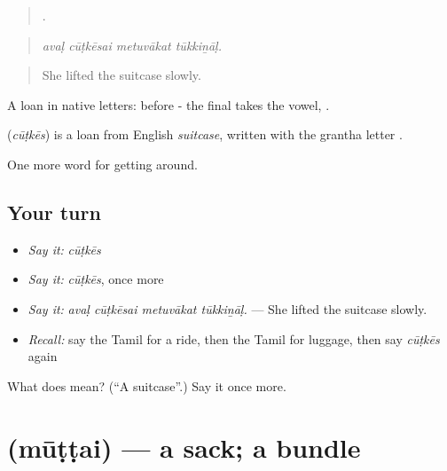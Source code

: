 \begin{quote}
   .
\end{quote}

\begin{quote}
\emph{avaḷ cūṭkēsai metuvākat tūkkiṉāḷ.}
\end{quote}

\begin{quote}
She lifted the suitcase slowly.
\end{quote}

A loan in native letters: before - the final  takes the vowel, .

\begin{cousinweb}
\textbf{} (\emph{cūṭkēs}) is a loan from English \emph{suitcase}, written with the grantha letter .
\end{cousinweb}

\begin{grammarlens}[title={What you've built}]
One more word for getting around.
\end{grammarlens}

\subsection*{Your turn}
\begin{itemize}
\raggedright
  \item \emph{Say it:} \emph{cūṭkēs}
  \item \emph{Say it:} \emph{cūṭkēs}, once more
  \item \emph{Say it:} \emph{avaḷ cūṭkēsai metuvākat tūkkiṉāḷ.} — She lifted the suitcase slowly.
  \item \emph{Recall:} say the Tamil for a ride, then the Tamil for luggage, then say \emph{cūṭkēs} again
\end{itemize}

\begin{tcolorbox}[breakable,colback=teal!4,colframe=teal!35!black,title={Before you move on}]
What does  mean? (\textquotedblleft{}A suitcase\textquotedblright{}.) Say it once more.
\end{tcolorbox}
\section[\texorpdfstring{\ta{மூட்டை} (mūṭṭai)}{மூட்டை (mūṭṭai)}]{ (mūṭṭai) — a sack; a bundle}

\label{lesson:TA-C402-muttai}



